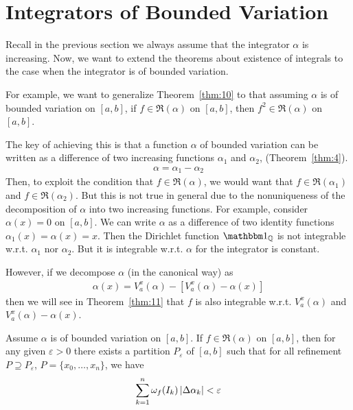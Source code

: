 \documentclass[thmcnt=section, color=blue, 12pt]{my-elegantbook}
\begin{document}
\section{Integrators of Bounded Variation}

Recall in the previous section we always assume that
the integrator $\alpha$ is increasing.
Now, we want to extend the theorems about existence of integrals
to the case when the integrator is of bounded variation.

For example, we want to generalize Theorem~\ref{thm:10} to
that assuming $\alpha$ is of bounded variation on $[a, b]$,
if $f \in \mathfrak{R}(\alpha)$ on $[a, b]$,
then $f^2 \in \mathfrak{R}(\alpha)$ on $[a, b]$.

The key of achieving this is that a function $\alpha$ of bounded variation
can be written as a difference of
two increasing functions $\alpha_1$ and $\alpha_2$,
(Theorem~\ref{thm:4}).
\begin{align*}
	\alpha = \alpha_1 - \alpha_2
\end{align*}
Then, to exploit the condition that $f \in \mathfrak{R}(\alpha)$,
we would want that $f \in \mathfrak{R}(\alpha_1)$ and $f \in \mathfrak{R}(\alpha_2)$.
But this is not true in general due to the nonuniqueness
of the decomposition of $\alpha$ into two increasing functions.
For example, consider $\alpha(x) = 0$ on $[a, b]$.
We can write $\alpha$ as a difference of two identity
functions $\alpha_1(x) = \alpha(x) = x$.
Then the Dirichlet function $\ind_{\Q}$ is not integrable
w.r.t. $\alpha_1$ nor $\alpha_2$.
But it is integrable w.r.t. $\alpha$ for the integrator is constant.

However, if we decompose $\alpha$ (in the canonical way) as
\begin{align*}
	\alpha(x) = V_a^x(\alpha) - [ V_a^x(\alpha) - \alpha(x) ]
\end{align*}
then we will see in Theorem~\ref{thm:11} that $f$
is also integrable w.r.t. $V_a^x(\alpha)$ and $V_a^x(\alpha) - \alpha(x)$.



\begin{lemma} \label{lem:1}
	Assume $\alpha$ is of bounded variation on $[a, b]$.
	If $f \in \mathfrak{R}(\alpha)$ on $[a, b]$,
	then for any given $\varepsilon > 0$
	there exists a partition $P_\varepsilon$ of $[a, b]$ such that
	for all refinement $P \supseteq P_\varepsilon$, $P = \{x_0, \ldots, x_n\}$,
	we have
	\begin{align}
		\sum_{k=1}^n \omega_f(I_k) \left\lvert \Delta \alpha_k \right\rvert < \varepsilon
		\label{eq:48}
	\end{align}
\end{lemma}
\end{document}

